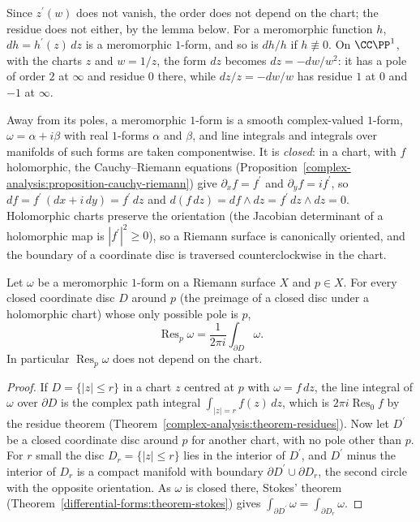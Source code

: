 Since $z^{\prime}(w)$ does not vanish, the order does not depend on the chart; the residue does not either, by the lemma below. For a meromorphic function $h$, $dh = h^{\prime}(z)\,dz$ is a
meromorphic $1$-form, and so is $dh/h$ if $h \not\equiv 0$. On $\CC\PP^1$, with the charts $z$ and $w = 1/z$, the form $dz$ becomes $dz = -dw/w^2$: it has a pole of order $2$ at $\infty$ and residue $0$
there, while $dz/z = -dw/w$ has residue $1$ at $0$ and $-1$ at $\infty$.

Away from its poles, a meromorphic $1$-form is a smooth complex-valued $1$-form, $\omega = \alpha + i\beta$ with real $1$-forms $\alpha$ and $\beta$, and line integrals and integrals over manifolds
of such forms are taken componentwise. It is \emph{closed}: in a chart, with $f$ holomorphic, the Cauchy--Riemann equations (Proposition~\ref{complex-analysis:proposition-cauchy-riemann}) give
$\partial_xf = f^{\prime}$ and $\partial_yf = if^{\prime}$, so $df = f^{\prime}\,(dx + i\,dy) = f^{\prime}\,dz$ and $d(f\,dz) = df \wedge dz = f^{\prime}\,dz \wedge dz = 0$. Holomorphic charts preserve the orientation (the
Jacobian determinant of a holomorphic map is $|f^{\prime}|^2 \geq 0$), so a Riemann surface is canonically oriented, and the boundary of a coordinate disc is traversed counterclockwise in the chart.

\begin{lemma}\label{complex-manifolds:lemma-residue-integral}
Let $\omega$ be a meromorphic $1$-form on a Riemann surface $X$ and $p \in X$. For every closed coordinate disc $D$ around $p$ (the preimage of a closed disc under a holomorphic chart) whose only
possible pole is $p$,
\[
\operatorname{Res}_p\omega = \frac{1}{2\pi i}\int_{\partial D}\omega .
\]
In particular $\operatorname{Res}_p\omega$ does not depend on the chart.
\end{lemma}

\begin{proof}
If $D = \{|z| \leq r\}$ in a chart $z$ centred at $p$ with $\omega = f\,dz$, the line integral of $\omega$ over $\partial D$ is the complex path integral $\int_{|z| = r}f(z)\,dz$, which is
$2\pi i\operatorname{Res}_0f$ by the residue theorem (Theorem~\ref{complex-analysis:theorem-residues}). Now let $D^{\prime}$ be a closed coordinate disc around $p$ for another chart, with no pole other than
$p$. For $r$ small the disc $D_r = \{|z| \leq r\}$ lies in the interior of $D^{\prime}$, and $D^{\prime}$ minus the interior of $D_r$ is a compact manifold with boundary $\partial D^{\prime} \cup \partial D_r$, the
second circle with the opposite orientation. As $\omega$ is closed there, Stokes' theorem (Theorem~\ref{differential-forms:theorem-stokes}) gives $\int_{\partial D^{\prime}}\omega = \int_{\partial D_r}\omega$.
\end{proof}


